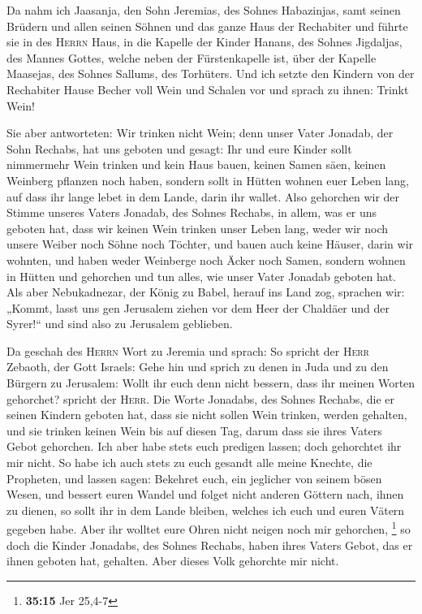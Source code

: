  Da nahm ich Jaasanja, den Sohn Jeremias, des Sohnes
Habazinjas, samt seinen Brüdern und allen seinen Söhnen und das ganze
Haus der Rechabiter  und führte sie in des \textsc{Herrn}
Haus, in die Kapelle der Kinder Hanans, des Sohnes Jigdaljas, des Mannes
Gottes, welche neben der Fürstenkapelle ist, über der Kapelle Maasejas,
des Sohnes Sallums, des Torhüters.  Und ich setzte den
Kindern von der Rechabiter Hause Becher voll Wein und Schalen vor und
sprach zu ihnen: Trinkt Wein!

 Sie aber antworteten: Wir trinken nicht Wein; denn unser
Vater Jonadab, der Sohn Rechabs, hat uns geboten und gesagt: Ihr und
eure Kinder sollt nimmermehr Wein trinken  und kein Haus
bauen, keinen Samen säen, keinen Weinberg pflanzen noch haben, sondern
sollt in Hütten wohnen euer Leben lang, auf dass ihr lange lebet in dem
Lande, darin ihr wallet.  Also gehorchen wir der Stimme
unseres Vaters Jonadab, des Sohnes Rechabs, in allem, was er uns geboten
hat, dass wir keinen Wein trinken unser Leben lang, weder wir noch
unsere Weiber noch Söhne noch Töchter,  und bauen auch
keine Häuser, darin wir wohnten, und haben weder Weinberge noch Äcker
noch Samen,  sondern wohnen in Hütten und gehorchen und
tun alles, wie unser Vater Jonadab geboten hat.  Als aber
Nebukadnezar, der König zu Babel, herauf ins Land zog, sprachen wir:
„Kommt, lasst uns gen Jerusalem ziehen vor dem Heer der Chaldäer und der
Syrer!{}`` und sind also zu Jerusalem geblieben.

 Da geschah des \textsc{Herrn} Wort zu Jeremia und
sprach:  So spricht der \textsc{Herr} Zebaoth, der Gott
Israels: Gehe hin und sprich zu denen in Juda und zu den Bürgern zu
Jerusalem: Wollt ihr euch denn nicht bessern, dass ihr meinen Worten
gehorchet? spricht der \textsc{Herr}.  Die Worte
Jonadabs, des Sohnes Rechabs, die er seinen Kindern geboten hat, dass
sie nicht sollen Wein trinken, werden gehalten, und sie trinken keinen
Wein bis auf diesen Tag, darum dass sie ihres Vaters Gebot gehorchen.
Ich aber habe stets euch predigen lassen; doch gehorchtet ihr mir nicht.
 So habe ich auch stets zu euch gesandt alle meine
Knechte, die Propheten, und lassen sagen: Bekehret euch, ein jeglicher
von seinem bösen Wesen, und bessert euren Wandel und folget nicht
anderen Göttern nach, ihnen zu dienen, so sollt ihr in dem Lande
bleiben, welches ich euch und euren Vätern gegeben habe. Aber ihr
wolltet eure Ohren nicht neigen noch mir gehorchen, \footnote{\textbf{35:15}
  Jer 25,4-7}  so doch die Kinder Jonadabs, des Sohnes
Rechabs, haben ihres Vaters Gebot, das er ihnen geboten hat, gehalten.
Aber dieses Volk gehorchte mir nicht.

